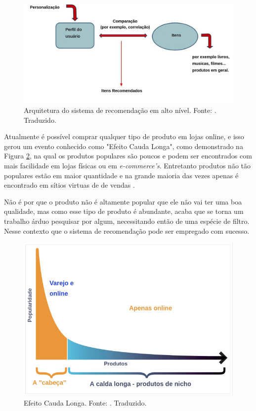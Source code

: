 \begin{figure}[H]
    \centering
    \includegraphics[scale=0.35]{figuras/referencial_teorico/sr_arquitetura.png}
    \caption[Arquitetura do sistema de recomendação em alto nível]{Arquitetura do sistema de recomendação em alto nível. Fonte: \cite{Stefanos:2008}. Traduzido.}
    \label{fig:sr_arquitetura}
\end{figure}

Atualmente é possível comprar qualquer tipo de produto em lojas online, e isso gerou um evento conhecido como "Efeito Cauda Longa", como demonstrado na Figura \ref{fig:efeito_cauda}, na qual os produtos populares são poucos e podem ser encontrados com mais facilidade em lojas físicas ou em \textit{e-commerce’s}. Entretanto produtos não tão populares estão em maior quantidade e na grande maioria das vezes apenas é encontrado em sítios virtuas de de vendas \cite{pandey:2019}.

Não é por que o produto não é altamente popular que ele não vai ter uma boa qualidade, mas como esse tipo de produto é abundante, acaba que se torna um trabalho árduo pesquisar por algum, necessitando então de uma espécie de filtro. Nesse contexto que o sistema de recomendação pode ser empregado com sucesso.

\begin{figure}[H]
    \centering
    \includegraphics[scale=0.35]{figuras/referencial_teorico/efeito_cauda.png}
    \caption[Efeito Cauda Longa]{Efeito Cauda Longa. Fonte: \cite{pandey:2019}. Traduzido.}
    \label{fig:efeito_cauda}
\end{figure}

